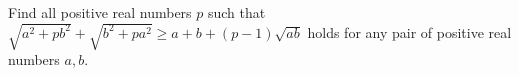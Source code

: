 Find all positive real numbers $p$ such that $\sqrt{a^2 + pb^2} +\sqrt{b^2 + pa^2} \ge a + b + (p - 1) \sqrt{ab}$ holds for any pair of positive real numbers $a, b$.